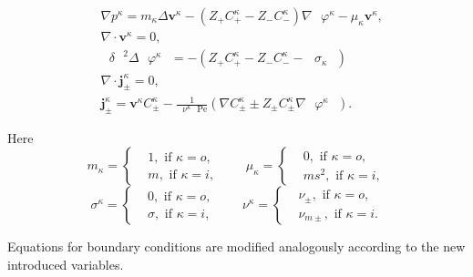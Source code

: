 \documentclass{amsart}
\begin{document}
\begin{equation}\label{Pr_in}
\begin{aligned}
&\nabla {{p}^{\kappa}}=m_{\kappa}\Delta {{\mathbf{v}^{\kappa}}}-\left( {{Z}_{+}}C^{\kappa}_{+}-{{Z}_{-}}C^{\kappa}_{-} \right)\nabla {{\text{ }\!\!\varphi^{\kappa}\!\!}}-{\mu}_{\kappa}{{\mathbf{v}^{\kappa}}},\\
&\nabla \cdot {{\mathbf{v}^{\kappa}}}=0,\\
&{{\text{ }\!\!\delta\!\!\text{ }}^{2}}\Delta {{\text{ }\!\!\varphi^{\kappa}\!\!\text{ }}}=-\left( {{Z}_{+}}C^{\kappa}_{+}-{{Z}_{-}}C^{\kappa}_{-}-\text{ }\!\!\sigma_{\kappa}\!\!\text{ } \right)\\					
&\nabla \cdot \mathbf{j}^{\kappa}_{\pm }=0,\\
&\mathbf{j}^{\kappa}_{\pm }={{\mathbf{v}^{\kappa}}}C^{\kappa}_{\pm }-\frac{1}{{{\text{ }\!\!\nu^{\kappa}\!\!\text{ }}}\text{Pe}}\left( \nabla C^{\kappa}_{\pm }\pm {{Z}_{\pm }}C^{\kappa}_{\pm }\nabla {{\text{ }\!\!\varphi^{\kappa}\!\!\text{ }}} \right).
\end{aligned}
\end{equation}

Here $${m}_{\kappa}=\begin{cases}& 1, \text{ if } \kappa=o,\\ & m, \text{ if } \kappa=i, \end{cases}\quad \quad
{\mu}_{\kappa}=\begin{cases}& 0, \text{ if } \kappa=o,\\ & ms^2, \text{ if } \kappa=i, \end{cases}$$
$${\sigma}^{\kappa}=\begin{cases}& 0, \text{ if } \kappa=o,\\ & \sigma, \text{ if } \kappa=i, \end{cases}\quad \quad
{\nu}^{\kappa}=\begin{cases}& {\nu}_{\pm}, \text{ if } \kappa=o,\\ & {\nu}_{m\pm }, \text{ if } \kappa=i. \end{cases}$$


Equations for boundary conditions are modified analogously according to the new introduced variables.
\end{document}
